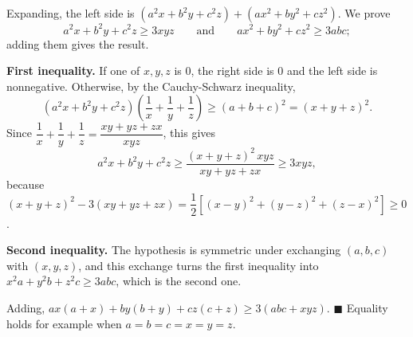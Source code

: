 Expanding, the left side is $(a^2x+b^2y+c^2z)+(ax^2+by^2+cz^2)$. We prove
\[
a^2x+b^2y+c^2z\ge3xyz\qquad\text{and}\qquad ax^2+by^2+cz^2\ge3abc ;
\]
adding them gives the result.

\textbf{First inequality.} If one of $x,y,z$ is $0$, the right side is $0$ and the left side is nonnegative. Otherwise, by the Cauchy-Schwarz inequality,
\[
\left(a^2x+b^2y+c^2z\right)\left(\dfrac{1}{x}+\dfrac{1}{y}+\dfrac{1}{z}\right)\ge(a+b+c)^2=(x+y+z)^2 .
\]
Since $\dfrac{1}{x}+\dfrac{1}{y}+\dfrac{1}{z}=\dfrac{xy+yz+zx}{xyz}$, this gives
\[
a^2x+b^2y+c^2z\ge\dfrac{(x+y+z)^2\,xyz}{xy+yz+zx}\ge3xyz,
\]
because $(x+y+z)^2-3(xy+yz+zx)=\dfrac{1}{2}\left[(x-y)^2+(y-z)^2+(z-x)^2\right]\ge0$.

\textbf{Second inequality.} The hypothesis is symmetric under exchanging $(a,b,c)$ with $(x,y,z)$, and this exchange turns the first inequality into $x^2a+y^2b+z^2c\ge3abc$, which is the second one.

Adding, $ax(a+x)+by(b+y)+cz(c+z)\ge3(abc+xyz)$. $\blacksquare$ Equality holds for example when $a=b=c=x=y=z$.
